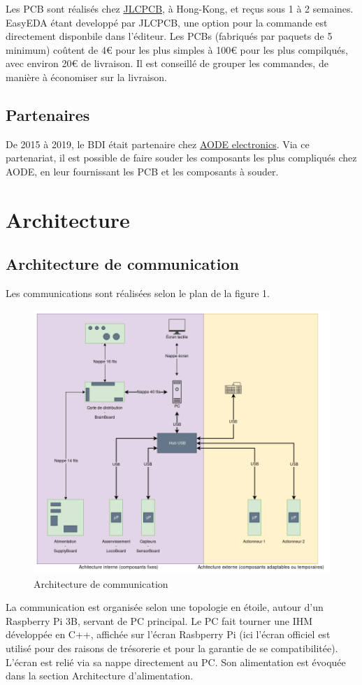 \documentclass[a4paper,10pt]{refart}
\begin{document}
	Les PCB sont réalisés chez \href{https://jlcpcb.com/}{JLCPCB}, à 
	Hong-Kong, et reçus sous 1 à 2 semaines. EasyEDA étant developpé par 
	JLCPCB, une option pour la commande est directement disponbile dans 
	l'éditeur. Les PCBs (fabriqués par paquets de 5 minimum) coûtent de 4€ pour 
	les plus simples à 100€ pour les plus compilqués, avec environ 20€ de 
	livraison. Il est conseillé de grouper les commandes, de manière à 
	économiser sur la livraison.

\subsection{Partenaires}
	De 2015 à 2019, le BDI était partenaire chez 
	\href{http://www.aode-electronics.com/}{AODE electronics}. Via ce 
	partenariat, il est possible de faire souder les composants les plus
	compliqués chez AODE, en leur fournissant les PCB et les composants à 
	souder.

\newpage
\section{Architecture}

\subsection{Architecture de communication}
	Les communications sont réalisées selon le plan de la figure 1.
	\begin{figure}[h]
		\caption{Architecture de communication}
		\centering
		\includegraphics[width=1\textwidth]{pictures/arch_data}
	\end{figure}
	La communication est organisée selon une topologie en étoile, autour d'un
	Raspberry Pi 3B, servant de PC principal. Le PC fait tourner une IHM
	développée en C++, affichée sur l'écran Rasbperry Pi (ici l'écran officiel
	est utilisé pour des raisons de trésorerie et pour la garantie de se
	compatibilitée). L'écran est relié via sa nappe directement au PC. Son 
	alimentation est évoquée dans la section Architecture d'alimentation.
\end{document}
